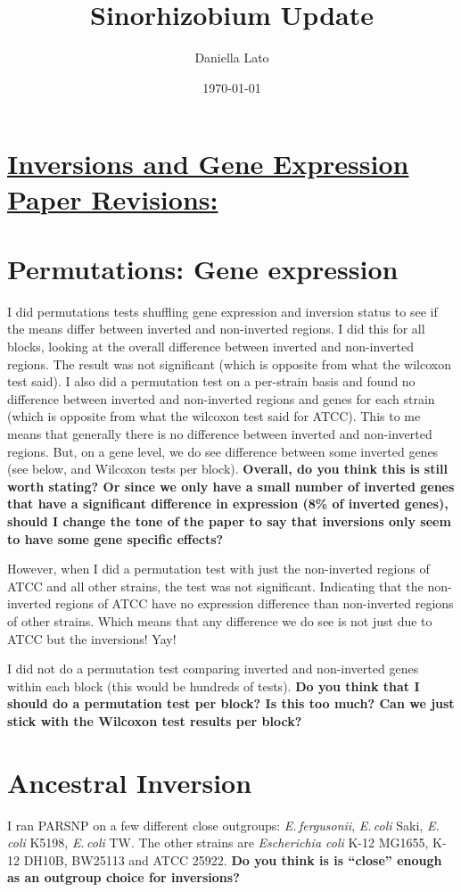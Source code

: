 \documentclass[12pt]{article}
\title{Sinorhizobium Update}
\author{Daniella Lato}
\date{\today}
\newcommand{\efer}{\textit{E.\,fergusonii}\xspace}
\newcommand{\ecol}{\textit{E.\,coli}\xspace}
\newcommand{\ecoli}{\textit{Escherichia coli}\xspace}
\begin{document}
\section*{\underline{Inversions and Gene Expression Paper Revisions:}}


\section*{Permutations: Gene expression}
I did permutations tests shuffling gene expression and inversion status to see if the means differ between inverted and non-inverted regions. 
I did this for all blocks, looking at the overall difference between inverted and non-inverted regions.
The result was not significant (which is opposite from what the wilcoxon test said).
I also did a permutation test on a per-strain basis and found no difference between inverted and non-inverted regions and genes for each strain (which is opposite from what the wilcoxon test said for ATCC).
This to me means that generally there is no difference between inverted and non-inverted regions.
But, on a gene level, we do see difference between some inverted genes (see below, and Wilcoxon tests per block).
\textbf{Overall, do you think this is still worth stating? Or since we only have a small number of inverted genes that have a significant difference in expression (8\% of inverted genes), should I change the tone of the paper to say that inversions only seem to have some gene specific effects?}

However, when I did a permutation test with just the non-inverted regions of ATCC and all other strains, the test was not significant.
Indicating that the non-inverted regions of ATCC have no expression difference than non-inverted regions of other strains. 
Which means that any difference we do see is not just due to ATCC but the inversions! Yay!

I did not do a permutation test comparing inverted and non-inverted genes within each block (this would be hundreds of tests).
\textbf{Do you think that I should do a permutation test per block? Is this too much? Can we just stick with the Wilcoxon test results per block?}



\section*{Ancestral Inversion}
I ran PARSNP on a few different close outgroups: \efer, \ecol Saki, \ecol K5198, \ecol TW. 
The other strains are \ecoli K-12 MG1655, K-12 DH10B, BW25113 and ATCC 25922.
\textbf{Do you think is is ``close'' enough as an outgroup choice for inversions?}
\end{document}
